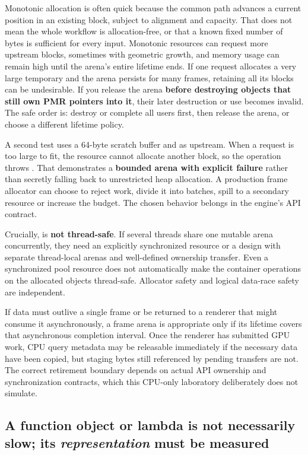 Monotonic allocation is often quick because the common path advances a current position in an existing block, subject to alignment and capacity. That does not mean the whole workflow is allocation-free, or that a known fixed number of bytes is sufficient for every input. Monotonic resources can request more upstream blocks, sometimes with geometric growth, and memory usage can remain high until the arena's entire lifetime ends. If one request allocates a very large temporary and the arena persists for many frames, retaining all its blocks can be undesirable. If you release the arena \textbf{before destroying objects that still own PMR pointers into it}, their later destruction or use becomes invalid. The safe order is: destroy or complete all users first, then release the arena, or choose a different lifetime policy.

A second test uses a 64-byte scratch buffer and  as upstream. When a request is too large to fit, the resource cannot allocate another block, so the operation throws . That demonstrates a \textbf{bounded arena with explicit failure} rather than secretly falling back to unrestricted heap allocation. A production frame allocator can choose to reject work, divide it into batches, spill to a secondary resource or increase the budget. The chosen behavior belongs in the engine's API contract.

Crucially,  is \textbf{not thread-safe}. If several threads share one mutable arena concurrently, they need an explicitly synchronized resource or a design with separate thread-local arenas and well-defined ownership transfer. Even a synchronized pool resource does not automatically make the container operations on the allocated objects thread-safe. Allocator safety and logical data-race safety are independent.

If data must outlive a single frame or be returned to a renderer that might consume it asynchronously, a frame arena is appropriate only if its lifetime covers that asynchronous completion interval. Once the renderer has submitted GPU work, CPU query metadata may be releasable immediately if the necessary data have been copied, but staging bytes still referenced by pending transfers are not. The correct retirement boundary depends on actual API ownership and synchronization contracts, which this CPU-only laboratory deliberately does not simulate.

\subsection{\texorpdfstring{A function object or lambda is not necessarily slow; its \emph{representation} must be measured}{A function object or lambda is not necessarily slow; its representation must be measured}}\label{05-engine-i-ch006-a-function-object-or-lambda-is-not-necessarily-slow-its-representation-must-be-measured}

